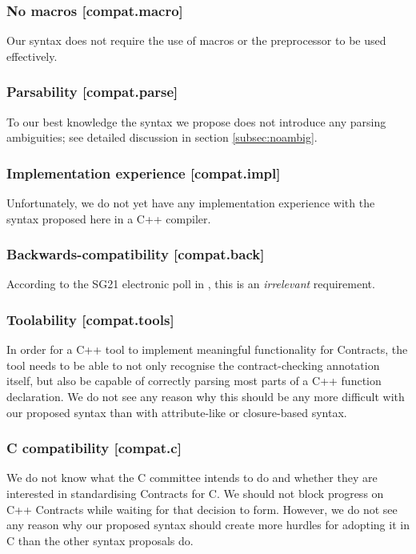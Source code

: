 \subsubsection{No macros  [compat.macro]}

Our syntax does not require the use of macros or the preprocessor to be used effectively.

\subsubsection{Parsability  [compat.parse]}

To our best knowledge the syntax we propose does not introduce any parsing ambiguities; see detailed discussion in section \ref{subsec:noambig}.

\subsubsection{Implementation experience  [compat.impl]}

Unfortunately, we do not yet have any implementation experience with the syntax proposed here in a C++ compiler.

\subsubsection{Backwards-compatibility  [compat.back]}

According to the SG21 electronic poll in \cite{P2885R2}, this is an \emph{irrelevant} requirement.

\subsubsection{Toolability [compat.tools]}

In order for a C++ tool to implement meaningful functionality for Contracts, the tool needs to be able to not only recognise the contract-checking annotation itself, but also be capable of correctly parsing most parts of a C++ function declaration. We do not see any reason why this should be any more difficult with our proposed syntax than with attribute-like or closure-based syntax.

\subsubsection{C compatibility  [compat.c]}

We do not know what the C committee intends to do and whether they are interested in standardising Contracts for C. We should not block progress on C++ Contracts while waiting for that decision to form. However, we do not see any reason why our proposed syntax should create more hurdles for adopting it in C than the other syntax proposals do.

